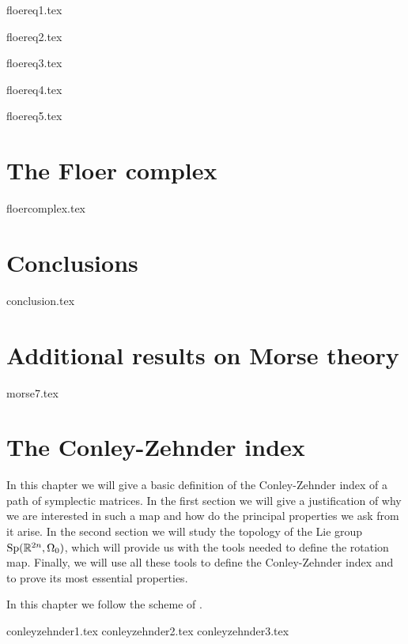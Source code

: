 \documentclass[a4paper,11pt]{book}
\begin{document}
 {floereq1.tex}

 {floereq2.tex}

 {floereq3.tex}

 {floereq4.tex}

 {floereq5.tex}

\chapter{The Floer complex}
{floercomplex.tex}

\chapter*{Conclusions}
{conclusion.tex}

\begin{appendices}
\chapter{Additional results on Morse theory}
{morse7.tex}

\chapter{The Conley-Zehnder index} \label{chapter:conley_zehnder}

In this chapter we will give a basic definition of the Conley-Zehnder index of a path of symplectic matrices. In the first section we will give a justification of why we are interested in such a map and how do the principal properties we ask from it arise. In the second section we will study the topology of the Lie group $\mathrm{Sp}(\mathbb{R}^{2n},\Omega_0)$, which will provide us with the tools needed to define the rotation map. Finally, we will use all these tools to define the Conley-Zehnder index and to prove its most essential properties.

In this chapter we follow the scheme of \cite{gutt2012conley}.

{conleyzehnder1.tex}
{conleyzehnder2.tex}
{conleyzehnder3.tex}
\end{appendices}



\end{document}
